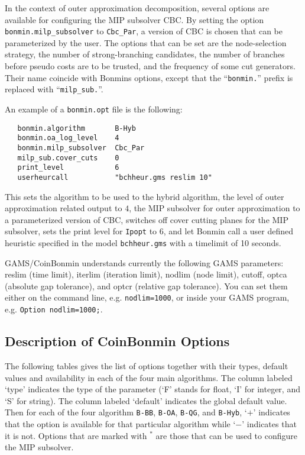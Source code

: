 In the context of outer approximation decomposition, several options are available for configuring the MIP subsolver CBC.
By setting the option \texttt{bonmin.milp\_subsolver} to \texttt{Cbc\_Par}, a version of CBC is chosen that can be parameterized by the user.
The options that can be set are the node-selection strategy, the number of strong-branching candidates, the number of branches before pseudo costs are to be trusted, and the frequency of some cut generators.
Their name coincide with Bonmins options, except that the ``\texttt{bonmin.}'' prefix is replaced with  ``\texttt{milp\_sub.}''.

An example of a \texttt{bonmin.opt} file is the following:
\begin{verbatim}
   bonmin.algorithm       B-Hyb
   bonmin.oa_log_level    4
   bonmin.milp_subsolver  Cbc_Par
   milp_sub.cover_cuts    0
   print_level            6
   userheurcall           "bchheur.gms reslim 10"
\end{verbatim}
This sets the algorithm to be used to the hybrid algorithm, the level of outer approximation related output to $4$, the MIP subsolver for outer approximation to a parameterized version of CBC, switches off cover cutting planes for the MIP subsolver, sets the print level for \texttt{Ipopt} to $6$, and let Bonmin call a user defined heuristic specified in the model \texttt{bchheur.gms} with a timelimit of 10 seconds.

GAMS/CoinBonmin understands currently the following GAMS parameters: reslim (time limit), iterlim (iteration limit), nodlim (node limit), cutoff, optca (absolute gap tolerance), and optcr (relative gap tolerance).
You can set them either on the command line, e.g. \verb+nodlim=1000+, or inside your GAMS program, e.g. \verb+Option nodlim=1000;+.

\subsection{Description of CoinBonmin Options}
\label{sub:bonminoptions}

The following tables gives the list of options together with their types, default values and availability in each of the four main algorithms.
The column labeled `type' indicates the type of the parameter (`F' stands for float, `I' for integer, and `S' for
string).
The column labeled `default' indicates the global default value.
Then for each of the four algorithm \texttt{B-BB}, \texttt{B-OA}, \texttt{B-QG}, and \texttt{B-Hyb}, `$+$' indicates that the option is available for that particular algorithm while `$-$' indicates that it is not.
Options that are marked with $^*$ are those that can be used to configure the MIP subsolver.

